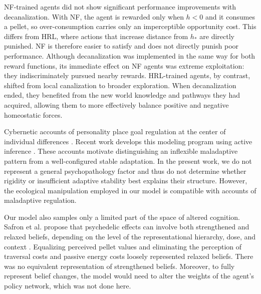 \documentclass[12pt,fleqn]{article}
\begin{document}
NF-trained agents did not show significant performance improvements with decanalization. With NF, the agent is rewarded only when \(h < 0\) and it consumes a pellet, so over-consumption carries only an imperceptible opportunity cost. This differs from HRL, where actions that increase distance from \(h_*\) are directly punished. NF is therefore easier to satisfy and does not directly punish poor performance. Although decanalization was implemented in the same way for both reward functions, its immediate effect on NF agents was extreme exploitation: they indiscriminately pursued nearby rewards. HRL-trained agents, by contrast, shifted from local canalization to broader exploration. When decanalization ended, they benefited from the new world knowledge and pathways they had acquired, allowing them to more effectively balance positive and negative homeostatic forces.

Cybernetic accounts of personality place goal regulation at the center of individual differences \cite{safron_deyoung_2021}. Recent work develops this modeling program using active inference \cite{safron_sheikhbahaee_2024}. These accounts motivate distinguishing an inflexible maladaptive pattern from a well-configured stable adaptation. In the present work, we do not represent a general psychopathology factor and thus do not determine whether rigidity or insufficient adaptive stability best explains their structure. However, the ecological manipulation employed in our model is compatible with accounts of maladaptive regulation.

Our model also samples only a limited part of the space of altered cognition. Safron et al. propose that psychedelic effects can involve both strengthened and relaxed beliefs, depending on the level of the representational hierarchy, dose, and context \cite{safron_albus_2025}. Equalizing perceived pellet values and eliminating the perception of traversal costs and passive energy costs loosely represented relaxed beliefs. There was no equivalent representation of strengthened beliefs. Moreover, to fully represent belief changes, the model would need to alter the weights of the agent's policy network, which was not done here.
\end{document}
